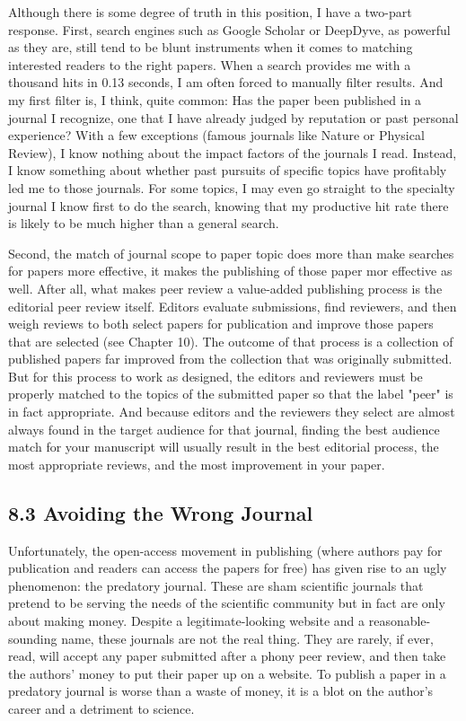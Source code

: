 Although there is some degree of truth in this position, I have a two-part response. First, search engines such as Google Scholar or DeepDyve, as powerful as they are, still tend to be blunt instruments when it comes to matching interested readers to the right papers. When a search provides me with a thousand hits in 0.13 seconds, I am often forced to manually filter results. And my first filter is, I think, quite common: Has the paper been published in a journal I recognize, one that I have already judged by reputation or past personal experience? With a few exceptions (famous journals like Nature or Physical Review), I know nothing about the impact factors of the journals I read. Instead, I know something about whether past pursuits of specific topics have profitably led me to those journals. For some topics, I may even go straight to the specialty journal I know first to do the search, knowing that my productive hit rate there is likely to be much higher than a general search.

Second, the match of journal scope to paper topic does more than make searches for papers more effective, it makes the publishing of those paper mor effective as well. After all, what makes peer review a value-added publishing process is the editorial peer review itself. Editors evaluate submissions, find reviewers, and then weigh reviews to both select papers for publication and improve those papers that are selected (see Chapter 10). The outcome of that process is a collection of published papers far improved from the collection that was originally submitted. But for this process to work as designed, the editors and reviewers must be properly matched to the topics of the submitted paper so that the label "peer" is in fact appropriate. And because editors and the reviewers they select are almost always found in the target audience for that journal, finding the best audience match for your manuscript will usually result in the best editorial process, the most appropriate reviews, and the most improvement in your paper.

\subsection*{8.3 Avoiding the Wrong Journal}
Unfortunately, the open-access movement in publishing (where authors pay for publication and readers can access the papers for free) has given rise to an ugly phenomenon: the predatory journal. These are sham scientific journals that pretend to be serving the needs of the scientific community but in fact are only about making money. Despite a legitimate-looking website and a reasonable-sounding name, these journals are not the real thing. They are rarely, if ever, read, will accept any paper submitted after a phony peer review, and then take the authors' money to put their paper up on a website. To publish a paper in a predatory journal is worse than a waste of money, it is a blot on the author's career and a detriment to science.

